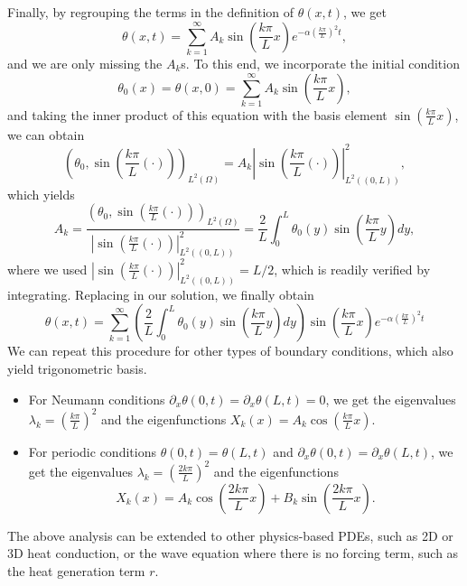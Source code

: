 Finally, by regrouping the terms in the definition of $\theta(x,t)$, we get 
\begin{equation*}
    \theta(x,t) = \sum_{k=1}^\infty A_k\sin\left(\frac{k\pi}{L}x\right) e^{-\alpha\left(\frac{k\pi}{L}\right)^2 t},
\end{equation*}
and we are only missing the $A_k$s. To this end, we incorporate the initial condition 
\begin{equation*}
    \theta_0(x) = \theta(x,0) = \sum_{k=1}^\infty A_k\sin\left(\frac{k\pi}{L}x\right),
\end{equation*}
and taking the inner product of this equation with the basis element $\sin\left(\frac{k\pi}{L}x\right)$, we can obtain 
\begin{equation*}
    \left(\theta_0, \sin\left(\frac{k\pi}{L}(\cdot)\right)\right)_{L^2(\Omega)} = A_k\left|\sin\left(\frac{k\pi}{L}(\cdot)\right)\right|^2_{L^2((0,L))},
\end{equation*}
which yields
\begin{equation*}
    A_k = \frac{\left(\theta_0, \sin\left(\frac{k\pi}{L}(\cdot)\right)\right)_{L^2(\Omega)}}{\left|\sin\left(\frac{k\pi}{L}(\cdot)\right)\right|^2_{L^2((0,L))}} = \frac{2}{L}\int_0^L \theta_0(y)\sin\left(\frac{k\pi}{L}y\right)dy,
\end{equation*}
where we used $\left|\sin\left(\frac{k\pi}{L}(\cdot)\right)\right|^2_{L^2((0,L))} = L/2$, which is readily verified by integrating. Replacing in our solution, we finally obtain 
\begin{equation*}
    \theta(x,t) = \sum_{k=1}^\infty \left(\frac{2}{L}\int_0^L \theta_0(y)\sin\left(\frac{k\pi}{L}y\right)dy\right)\sin\left(\frac{k\pi}{L}x\right) e^{-\alpha\left(\frac{k\pi}{L}\right)^2 t}
\end{equation*}
We can repeat this procedure for other types of boundary conditions, which also yield trigonometric basis.
\begin{itemize}
    \item For Neumann conditions $\partial_x\theta(0,t) = \partial_x\theta(L,t) = 0$, we get the eigenvalues $\lambda_k = \left(\frac{k\pi}{L}\right)^2$ and the eigenfunctions $X_k(x) = A_k \cos \left(\frac{k\pi}{L}x\right)$.
    \item For periodic conditions $\theta(0,t) = \theta(L,t)$ and $\partial_x \theta(0,t) = \partial_x\theta(L,t)$, we get the eigenvalues $\lambda_k = \left(\frac{2k\pi}{L}\right)^2$ and the eigenfunctions 
    \begin{equation*}
        X_k(x) = A_k\cos\left(\frac{2k\pi}{L}x\right) + B_k \sin\left(\frac{2k\pi}{L}x\right).
    \end{equation*}
\end{itemize}
The above analysis can be extended to other physics-based PDEs, such as 2D or 3D heat conduction, or the wave equation where there is no forcing term, such as the heat generation term $r$. 
